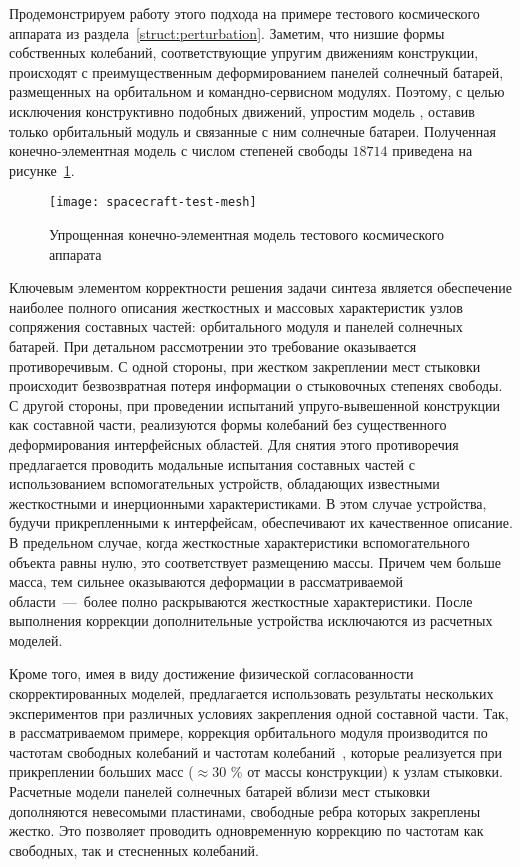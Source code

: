 Продемонстрируем работу этого подхода на примере тестового космического аппарата из раздела~\ref{struct:perturbation}. Заметим, что низшие формы собственных колебаний, соответствующие упругим движениям конструкции, происходят с преимущественным деформированием панелей солнечный батарей, размещенных на орбитальном и командно-сервисном модулях. Поэтому, с целью исключения конструктивно подобных движений, упростим модель , оставив только орбитальный модуль и связанные с ним солнечные батареи. Полученная конечно-элементная модель с числом степеней свободы $ 18714 $ приведена на рисунке~\ref{fig:spacecraft-test-mesh}.

\begin{figure}[!htb]
	\centering
	\texttt{[image: spacecraft-test-mesh]}
	\caption{Упрощенная конечно-элементная модель тестового космического аппарата} \label{fig:spacecraft-test-mesh}
\end{figure}

Ключевым элементом корректности решения задачи синтеза является обеспечение наиболее полного описания жесткостных и массовых характеристик узлов сопряжения составных частей: орбитального модуля и панелей солнечных батарей. При детальном рассмотрении это требование оказывается противоречивым. С одной стороны, при жестком закреплении мест стыковки происходит безвозвратная потеря информации о стыковочных степенях свободы. С другой стороны, при проведении испытаний упруго-вывешенной конструкции как составной части, реализуются формы колебаний без существенного деформирования интерфейсных областей. Для снятия этого противоречия предлагается проводить модальные испытания составных частей с использованием вспомогательных устройств, обладающих известными жесткостными и инерционными характеристиками. В этом случае устройства, будучи прикрепленными к интерфейсам, обеспечивают их качественное описание. В предельном случае, когда жесткостные характеристики вспомогательного объекта равны нулю, это соответствует размещению массы. Причем чем больше масса, тем сильнее оказываются деформации в рассматриваемой области~---~более полно раскрываются жесткостные характеристики. После выполнения коррекции дополнительные устройства исключаются из расчетных моделей.

Кроме того, имея в виду достижение физической согласованности скорректированных моделей, предлагается использовать результаты нескольких экспериментов при различных условиях закрепления одной составной части. Так, в рассматриваемом примере, коррекция орбитального модуля производится по частотам свободных колебаний и частотам колебаний~, которые реализуется при прикреплении больших масс ($ \approx 30 $ \% от массы конструкции) к узлам стыковки. Расчетные модели панелей солнечных батарей вблизи мест стыковки дополняются невесомыми пластинами, свободные ребра которых закреплены жестко. Это позволяет проводить одновременную коррекцию по частотам как свободных, так и стесненных колебаний.

